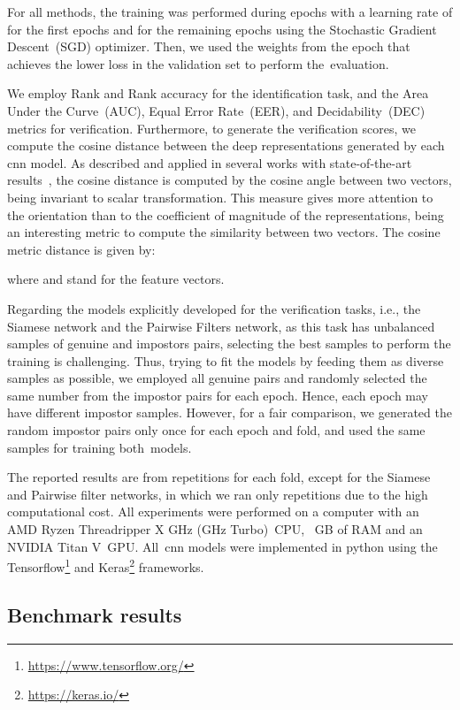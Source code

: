 \documentclass[journal]{IEEEtran}
\begin{document}
For all methods, the training was performed during  epochs with a learning rate of  for the first  epochs and  for the remaining epochs using the Stochastic Gradient Descent~(SGD) optimizer.
Then, we used the weights from the epoch that achieves the lower loss in the validation set to perform the~evaluation.

We employ Rank  and Rank  accuracy for the identification task, and the Area Under the Curve~(AUC), Equal Error Rate~(EER), and Decidability~(DEC) metrics for verification.
Furthermore, to generate the verification scores, we compute the cosine distance between the deep representations generated by each \gls{cnn} model.
As described and applied in several works with state-of-the-art results~\cite{Luz2018, zanlorensi2018impact, zanlorensi2020deep, zanlorensi2020attnormalization}, the cosine distance is computed by the cosine angle between two vectors, being invariant to scalar transformation.
This measure gives more attention to the orientation than to the coefficient of magnitude of the representations, being an interesting metric to compute the similarity between two vectors.
The cosine metric distance is given by:

\noindent where  and  stand for the feature vectors.

Regarding the models explicitly developed for the verification tasks, i.e., the Siamese network and the Pairwise Filters network, as this task has unbalanced samples of genuine and impostors pairs, selecting the best samples to perform the training is challenging.
Thus, trying to fit the models by feeding them as diverse samples as possible, we employed all genuine pairs and randomly selected the same number from the impostor pairs for each epoch.
Hence, each epoch may have different impostor samples.
However, for a fair comparison, we generated the random impostor pairs only once for each epoch and fold, and used the same samples for training both~models.

The reported results are from  repetitions for each fold, except for the Siamese and Pairwise filter networks, in which we ran only  repetitions due to the high computational cost.
All experiments were performed on a computer with an AMD Ryzen Threadripper X GHz (GHz Turbo)~CPU, ~GB of RAM and an NVIDIA Titan V~GPU.
All~\gls{cnn} models were implemented in python using the Tensorflow\footnote{\url{https://www.tensorflow.org/}} and Keras\footnote{\url{https://keras.io/}} frameworks.


\subsection{Benchmark results}
\end{document}
